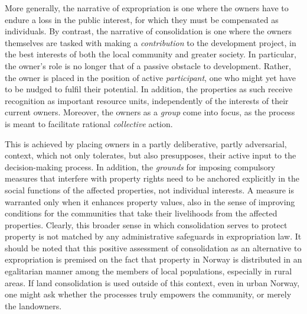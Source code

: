 More generally, the narrative of expropriation is one where the owners have to endure a loss in the public interest, for which they must be compensated as individuals. By contrast, the narrative of consolidation is one where the owners themselves are tasked with making a {\it contribution} to the development project, in the best interests of both the local community and greater society. In particular, the owner's role is no longer that of a passive obstacle to development. Rather, the owner is placed in the position of active {\it participant}, one who might yet have to be nudged to fulfil their potential. In addition, the properties as such receive recognition as important resource units, independently of the interests of their current owners. Moreover, the owners as a {\it group} come into focus, as the process is meant to facilitate rational {\it collective} action.

This is achieved by placing owners in a partly deliberative, partly adversarial, context, which not only tolerates, but also presupposes, their active input to the decision-making process. In addition, the {\it grounds} for imposing compulsory measures that interfere with property rights need to be anchored explicitly in the social functions of the affected properties, not individual interests. A measure is warranted only when it enhances property values, also in the sense of improving conditions for the communities that take their livelihoods from the affected properties. Clearly, this broader sense in which consolidation serves to protect property is not matched by any administrative safeguards in expropriation law.
It should be noted that this positive assessment of consolidation as an alternative to expropriation is premised on the fact that property in Norway is distributed in an egalitarian manner among the members of local populations, especially in rural areas. If land consolidation is used outside of this context, even in urban Norway, one might ask whether the processes truly empowers the community, or merely the landowners.

